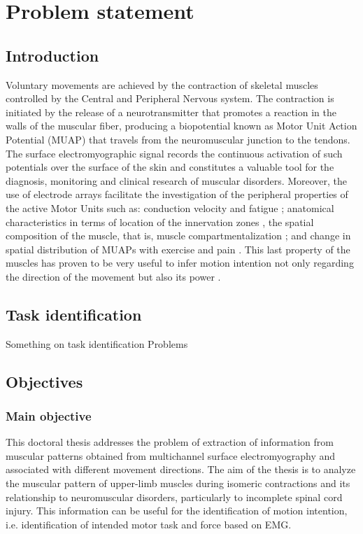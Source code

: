 \chapter{Problem statement}
	\section{Introduction}
    
 Voluntary movements are achieved by the contraction of skeletal muscles controlled by the Central and Peripheral Nervous system. The contraction is initiated by the release of a neurotransmitter that promotes a reaction in the walls of the muscular fiber, producing a biopotential known as Motor Unit Action Potential (MUAP) that travels from the neuromuscular junction to the tendons. The surface electromyographic signal records the continuous activation of such potentials over the surface of the skin and constitutes a valuable tool for the diagnosis, monitoring and clinical research of muscular disorders. Moreover, the use of electrode arrays facilitate the investigation of the peripheral properties of the active Motor Units such as: conduction velocity and fatigue \citep{Soares2015}; anatomical characteristics in terms of location of the innervation zones \citep{Beck2012}, the spatial composition of the muscle, that is, muscle compartmentalization \citep{Vieira2010}; and change in spatial distribution of MUAPs with exercise and pain \citep{Madeleine2006}. This last property of the muscles has proven to be very useful to infer motion intention not only regarding the direction of the movement but also its power \citep{Rojas-Martinez2013}.
    
    \section{Task identification}

Something on task identification Problems 

     \section{Objectives}
     
     	\subsection*{Main objective}
This doctoral thesis addresses the problem of extraction of information from muscular patterns obtained from multichannel surface electromyography and associated with different movement directions. The aim of the thesis is to analyze the muscular pattern of upper-limb muscles during isomeric contractions and its relationship to neuromuscular disorders, particularly to incomplete spinal cord injury. This information can be useful for the identification of motion intention, i.e. identification of intended motor task and force based on EMG.

